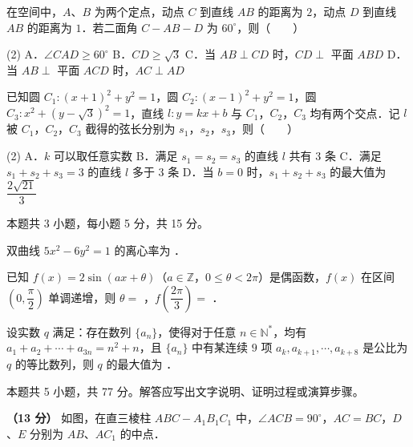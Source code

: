 在空间中，$A$、$B$ 为两个定点，动点 $C$ 到直线 $AB$ 的距离为 $2$，动点 $D$ 到直线 $AB$ 的距离为 $1$．若二面角 $C-AB-D$ 为 $60^\circ$，则（　　）

\begin{gkopts}(2)
\task A．$\angle CAD\ge 60^\circ$
\task B．$CD\ge\sqrt{3}$
\task C．当 $AB\perp CD$ 时，$CD\perp$ 平面 $ABD$
\task D．当 $AB\perp$ 平面 $ACD$ 时，$AC\perp AD$
\end{gkopts}

已知圆 $C_1:(x+1)^2+y^2=1$，圆 $C_2:(x-1)^2+y^2=1$，圆 $C_3:x^2+(y-\sqrt{3})^2=1$，直线 $l:y=kx+b$ 与 $C_1$，$C_2$，$C_3$ 均有两个交点．记 $l$ 被 $C_1$，$C_2$，$C_3$ 截得的弦长分别为 $s_1$，$s_2$，$s_3$，则（　　）

\begin{gkopts}(2)
\task A．$k$ 可以取任意实数
\task B．满足 $s_1=s_2=s_3$ 的直线 $l$ 共有 $3$ 条
\task C．满足 $s_1+s_2+s_3=3$ 的直线 $l$ 多于 $3$ 条
\task D．当 $b=0$ 时，$s_1+s_2+s_3$ 的最大值为 $\dfrac{2\sqrt{21}}{3}$
\end{gkopts}

\par\medskip


\begin{gktip}
本题共 3 小题，每小题 5 分，共 15 分。
\end{gktip}

双曲线 $5x^2-6y^2=1$ 的离心率为 \gkblank{}．

已知 $f(x)=2\sin(ax+\theta)$（$a\in\mathbb{Z}$，$0\le\theta<2\pi$）是偶函数，$f(x)$ 在区间 $\left(0,\dfrac{\pi}{2}\right)$ 单调递增，则 $\theta=$ \gkblank{}，$f\left(\dfrac{2\pi}{3}\right)=$ \gkblank{}．

设实数 $q$ 满足：存在数列 $\{a_n\}$，使得对于任意 $n\in\mathbb{N}^*$，均有 $a_1+a_2+\cdots+a_{3n}=n^2+n$，且 $\{a_n\}$ 中有某连续 $9$ 项 $a_k,a_{k+1},\cdots,a_{k+8}$ 是公比为 $q$ 的等比数列，则 $q$ 的最大值为 \gkblank{}．

\par\medskip


\begin{gktip}
本题共 5 小题，共 77 分。解答应写出文字说明、证明过程或演算步骤。
\end{gktip}

\textbf{（13 分）} 如图，在直三棱柱 $ABC-A_1B_1C_1$ 中，$\angle ACB=90^\circ$，$AC=BC$，$D$、$E$ 分别为 $AB$、$AC_1$ 的中点．

